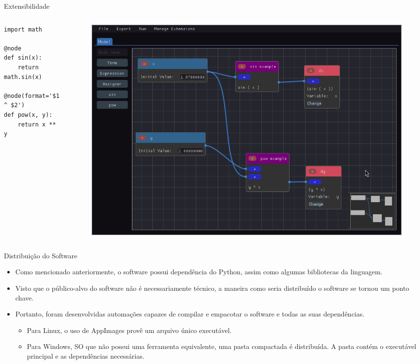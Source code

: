 \begin{frame}[fragile]{Extensibilidade}
    \begin{columns}
        \begin{column}{.3\textwidth}
            \begin{verbatim}
import math

@node
def sin(x):
    return math.sin(x)

@node(format='$1 ^ $2')
def pow(x, y):
    return x ** y
            \end{verbatim}
        \end{column}
        \begin{column}{.7\textwidth}
            \begin{figure}
                \centering
                \includegraphics[width=\textwidth]{contents/imgs/ode-designer/ext-sin-pow.png}
            \end{figure}
        \end{column}
    \end{columns}
\end{frame}

\begin{frame}{Distribuição do Software}
    \begin{itemize}
        \item Como mencionado anteriormente, o software possui dependência do Python, assim como algumas bibliotecas da linguagem.
        \item Visto que o público-alvo do software não é necessariamente técnico, a maneira como seria distribuído o software se tornou um ponto chave.
        \item Portanto, foram desenvolvidas automações capazes de compilar e empacotar o software e todas as suas dependências.
        \begin{itemize}
            \item Para Linux, o uso de AppImages provê um arquivo único executável.
            \item Para Windows, SO que não possui uma ferramenta equivalente, uma pasta compactada é distribuída. A pasta contém o executável principal e as dependências necessárias.
        \end{itemize}
    \end{itemize}
\end{frame}

